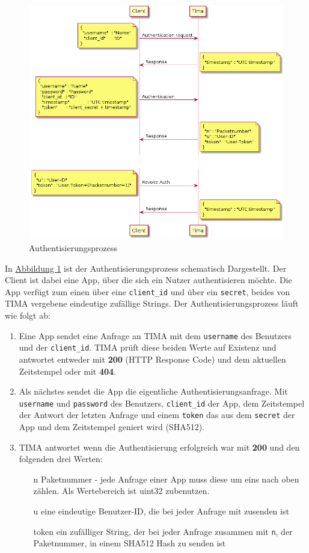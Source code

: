 \begin{figure}[!h]
	\centering
	\includegraphics[width=\textwidth]{images/auth.png}
	\caption{Authentisierungsprozess}
	\label{fig:auth}
\end{figure}

In \hyperref[fig:auth]{Abbildung \ref*{fig:auth}} ist der Authentisierungsprozess schematisch Dargestellt. Der Client ist dabei eine App, über die sich ein Nutzer authentisieren möchte. Die App verfügt zum einen über eine \texttt{client\_id} und über ein \texttt{secret}, beides von TIMA vergebene eindeutige zufällige Strings. Der Authentisierungsprozess läuft wie folgt ab:
\begin{enumerate}
	\item Eine App sendet eine Anfrage an TIMA mit dem \texttt{username} des Benutzers und der \texttt{client\_id}. TIMA prüft diese beiden Werte auf Existenz und antwortet entweder mit \textbf{200} (HTTP Response Code) und dem aktuellen Zeitstempel oder mit \textbf{404}.
	\item Als nächstes sendet die App die eigentliche Authentisierungsanfrage. Mit \texttt{username} und \texttt{password} des Benutzers, \texttt{client\_id} der App, dem Zeitstempel der Antwort der letzten Anfrage und einem \texttt{token} das aus dem \texttt{secret} der App und dem Zeitstempel geniert wird (SHA512).
	\item TIMA antwortet wenn die Authentisierung erfolgreich war mit \textbf{200} und den folgenden drei Werten:
	\begin{itemize}
		\item[n] Paketnummer - jede Anfrage einer App muss diese um eins nach oben zählen. Als Wertebereich ist uint32 zubenutzen.
		\item[u] eine eindeutige Benutzer-ID, die bei jeder Anfrage mit zusenden ist
		\item[token] ein zufälliger String, der bei jeder Anfrage zusammen mit \texttt{n}, der Paketnummer, in einem SHA512 Hash zu senden ist
	\end{itemize}
\end{enumerate}

